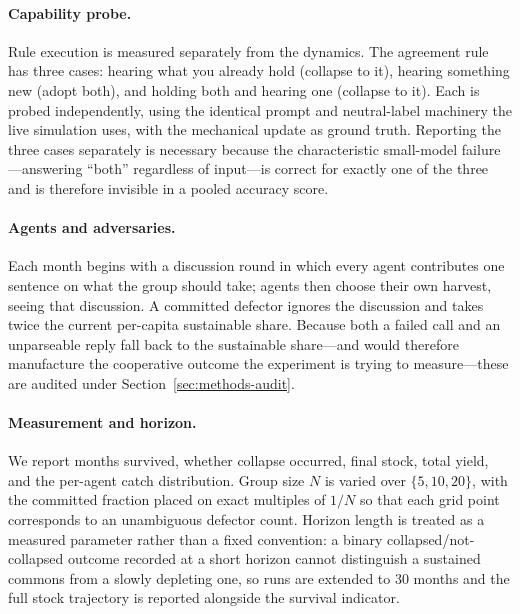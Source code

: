 \documentclass[manuscript,screen,review]{acmart}
\begin{document}
\paragraph{Capability probe.} Rule execution is measured separately from the
dynamics. The agreement rule has three cases: hearing what you already hold
(collapse to it), hearing something new (adopt both), and holding both and
hearing one (collapse to it). Each is probed independently, using the identical
prompt and neutral-label machinery the live simulation uses, with the mechanical
update as ground truth. Reporting the three cases separately is necessary because
the characteristic small-model failure---answering ``both'' regardless of
input---is correct for exactly one of the three and is therefore invisible in a
pooled accuracy score.

\paragraph{Agents and adversaries.} Each month begins with a discussion round in
which every agent contributes one sentence on what the group should take;
agents then choose their own harvest, seeing that discussion. A committed
defector ignores the discussion and takes twice the current per-capita
sustainable share. Because both a failed call and an unparseable reply fall back
to the sustainable share---and would therefore manufacture the cooperative
outcome the experiment is trying to measure---these are audited under
Section~\ref{sec:methods-audit}.

\paragraph{Measurement and horizon.} We report months survived, whether collapse
occurred, final stock, total yield, and the per-agent catch distribution. Group
size $N$ is varied over $\{5,10,20\}$, with the committed fraction placed on
exact multiples of $1/N$ so that each grid point corresponds to an unambiguous
defector count. Horizon length is treated as a measured parameter rather than a
fixed convention: a binary collapsed/not-collapsed outcome recorded at a short
horizon cannot distinguish a sustained commons from a slowly depleting one, so
runs are extended to $30$ months and the full stock trajectory is reported
alongside the survival indicator.
\end{document}
